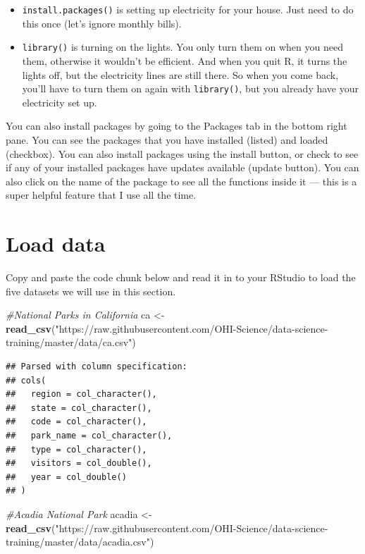 \documentclass[]{book}
\newenvironment{Shaded}{\begin{snugshade}}{\end{snugshade}}
\newcommand{\CommentTok}[1]{\textcolor[rgb]{0.56,0.35,0.01}{\textit{#1}}}
\newcommand{\KeywordTok}[1]{\textcolor[rgb]{0.13,0.29,0.53}{\textbf{#1}}}
\newcommand{\NormalTok}[1]{#1}
\newcommand{\StringTok}[1]{\textcolor[rgb]{0.31,0.60,0.02}{#1}}
\providecommand{\tightlist}{%
  \setlength{\itemsep}{0pt}\setlength{\parskip}{0pt}}
\begin{document}
\begin{itemize}
\tightlist
\item
  \texttt{install.packages()} is setting up electricity for your house. Just need to do this once (let's ignore monthly bills).
\item
  \texttt{library()} is turning on the lights. You only turn them on when you need them, otherwise it wouldn't be efficient. And when you quit R, it turns the lights off, but the electricity lines are still there. So when you come back, you'll have to turn them on again with \texttt{library()}, but you already have your electricity set up.
\end{itemize}

You can also install packages by going to the Packages tab in the bottom right pane. You can see the packages that you have installed (listed) and loaded (checkbox). You can also install packages using the install button, or check to see if any of your installed packages have updates available (update button). You can also click on the name of the package to see all the functions inside it --- this is a super helpful feature that I use all the time.

\hypertarget{load-data}{%
\section{Load data}\label{load-data}}

Copy and paste the code chunk below and read it in to your RStudio to load the five datasets we will use in this section.

\begin{Shaded}
\begin{Highlighting}[]
\CommentTok{#National Parks in California}
\NormalTok{ca <-}\StringTok{ }\KeywordTok{read_csv}\NormalTok{(}\StringTok{"https://raw.githubusercontent.com/OHI-Science/data-science-training/master/data/ca.csv"}\NormalTok{) }
\end{Highlighting}
\end{Shaded}

\begin{verbatim}
## Parsed with column specification:
## cols(
##   region = col_character(),
##   state = col_character(),
##   code = col_character(),
##   park_name = col_character(),
##   type = col_character(),
##   visitors = col_double(),
##   year = col_double()
## )
\end{verbatim}

\begin{Shaded}
\begin{Highlighting}[]
\CommentTok{#Acadia National Park}
\NormalTok{acadia <-}\StringTok{ }\KeywordTok{read_csv}\NormalTok{(}\StringTok{"https://raw.githubusercontent.com/OHI-Science/data-science-training/master/data/acadia.csv"}\NormalTok{)}
\end{Highlighting}
\end{Shaded}
\end{document}
